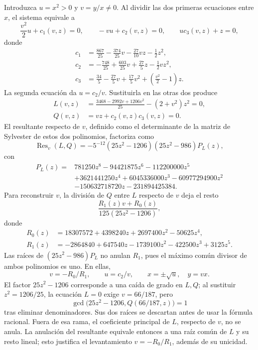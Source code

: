 Introduzca \(u=x^2>0\) y \(v=y/x\ne0\). Al dividir las dos primeras
ecuaciones entre \(x\), el sistema equivale a
\begin{equation}
 \frac{v^2}{2}u+c_1(v,z)=0,\qquad
 -vu+c_2(v,z)=0,\qquad u c_3(v,z)+z=0,
 \label{eq:pp-lorenz-reduced-three}
\end{equation}
donde
\begin{align}
 c_1&=\frac{867}{25}-\frac{374}{25}v-\frac{27}{10}vz-\frac12z^2,\nonumber\\
 c_2&=-\frac{748}{25}+\frac{603}{25}v+\frac{27}{5}z-\frac12vz^2,\\
 c_3&=\frac{34}{5}-\frac{27}{5}v+\frac{17}{5}v^2
       +\left(\frac{v^2}{2}-1\right)z.
 \label{eq:pp-lorenz-c-polynomials}
\end{align}
La segunda ecuación da \(u=c_2/v\). Sustituirla en las otras dos produce
\begin{align}
 L(v,z)&=\frac{3468-2992v+1206v^2}{25}-(2+v^2)z^2=0,\nonumber\\
 Q(v,z)&=vz+c_2(v,z)c_3(v,z)=0.
 \label{eq:pp-lorenz-two-polynomials}
\end{align}
El resultante respecto de \(v\), definido como el determinante de la
matriz de Sylvester de estos dos polinomios, factoriza como
\begin{equation}
 \operatorname{Res}_v(L,Q)
 =-5^{-12}(25z^2-1206)(25z^2-986)P_L(z),
 \label{eq:pp-lorenz-resultant}
\end{equation}
con
\begin{align}
 P_L(z)={}&781250z^8-94421875z^6-112200000z^5\nonumber\\
 &+3621441250z^4+6045336000z^3-60977294900z^2\nonumber\\
 &-150632718720z-231894425384.
 \label{eq:pp-lorenz-eliminant}
\end{align}
Para reconstruir \(v\), la división de \(Q\) entre \(L\) respecto de
\(v\) deja el resto
\[
 \frac{R_1(z)v+R_0(z)}{125(25z^2-1206)},
\]
donde
\begin{align}
 R_0(z)&=18307572+4398240z+2697400z^2-50625z^4,\nonumber\\
 R_1(z)&=-2864840+647540z-1739100z^2-422500z^3+3125z^5.
 \label{eq:pp-lorenz-reconstruction-polynomials}
\end{align}
Las raíces de \((25z^2-986)P_L\) no anulan \(R_1\), pues el máximo
común divisor de ambos polinomios es uno. En ellas,
\begin{equation}
 v=-R_0/R_1,\qquad u=c_2/v,\qquad
 x=\pm\sqrt u,\quad y=vx.
 \label{eq:pp-lorenz-reconstruction}
\end{equation}
El factor \(25z^2-1206\) corresponde a una caída de grado en \(L,Q\);
al sustituir \(z^2=1206/25\), la ecuación \(L=0\) exige
\(v=66/187\), pero
\[
 \gcd\bigl(25z^2-1206,Q(66/187,z)\bigr)=1
\]
tras eliminar denominadores. Sus dos raíces se descartan antes de usar
la fórmula racional. Fuera de esa rama, el coeficiente principal de
\(L\), respecto de \(v\), no se anula. La anulación del resultante
equivale entonces a una raíz común de \(L\) y su resto lineal; esto
justifica el levantamiento \(v=-R_0/R_1\), además de su unicidad.


